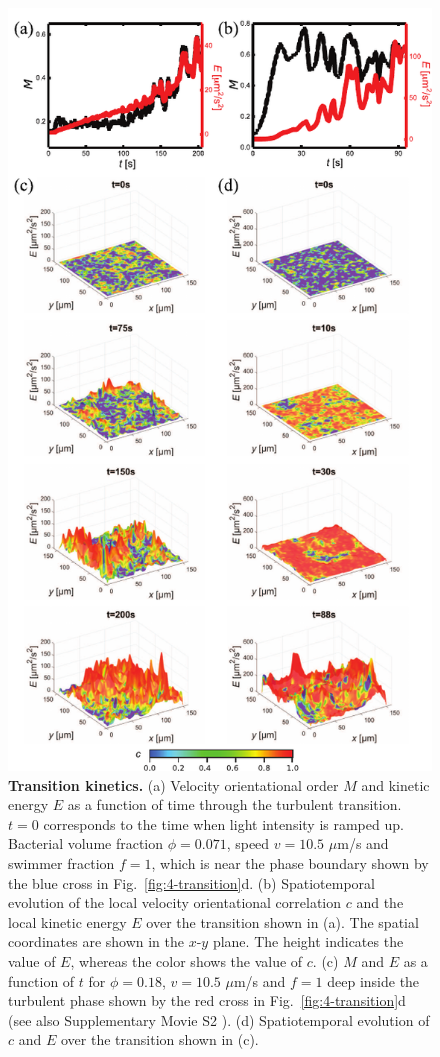\begin{figure}[!htbp]
	\begin{center}
	\includegraphics[height=5.2 in]{Figs/4-Emergence/3.pdf}
	\end{center}
	\caption[Transition kinetics]
	{
	\textbf{Transition kinetics.}
  (a) Velocity orientational order $M$ and kinetic energy $E$ as a function of time through the turbulent transition. $t = 0$ corresponds to the time when light intensity is ramped up. Bacterial volume fraction $\phi = 0.071$, speed $v = 10.5$ $\mu$m/s and swimmer fraction $f = 1$, which is near the phase boundary shown by the blue cross in Fig.~\ref{fig:4-transition}d.
  (b) Spatiotemporal evolution of the local velocity orientational correlation $c$ and the local kinetic energy $E$ over the transition shown in (a). The spatial coordinates are shown in the $x$-$y$ plane. The height indicates the value of $E$, whereas the color shows the value of $c$.
  (c) $M$ and $E$ as a function of $t$ for $\phi = 0.18$, $v = 10.5$ $\mu$m/s and $f = 1$ deep inside the turbulent phase shown by the red cross in Fig.~\ref{fig:4-transition}d (see also Supplementary Movie S2 \cite{suppMovies}).
  (d) Spatiotemporal evolution of $c$ and $E$ over the transition shown in (c).
	}
	\label{fig:4-kinetics}
\end{figure}



